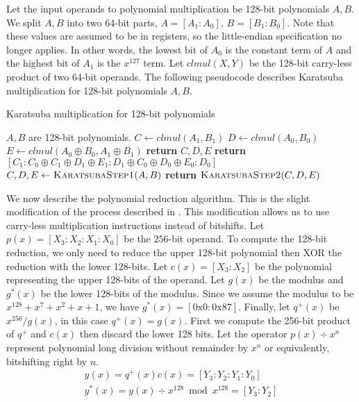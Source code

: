 \documentclass[hctr.tex]{subfiles}
\begin{document}
Let the input operands to polynomial multiplication be 128-bit polynomials $A, B$. We split $A, B$ into two 64-bit parts, $A = [A_1 : A_0]$, $B = [B_1 : B_0]$. Note that these values are assumed to be in registers, so the little-endian specification no longer applies. In other words, the lowest bit of $A_0$ is the constant term of $A$ and the highest bit of $A_1$ is the $x^{127}$ term. Let $clmul(X, Y)$ be the 128-bit carry-less product of two 64-bit operands. The following pseudocode describes Karatsuba multiplication for 128-bit polynomials $A, B$.
\begin{algorithm}[H]
\caption{Karatsuba multiplication for 128-bit polynomials}\label{karatsuba}
\begin{algorithmic}[1]
	\Require $A, B$ are 128-bit polynomials.
		\State $C \gets clmul(A_1, B_1)$
		\State $D \gets clmul(A_0, B_0)$
		\State $E \gets clmul(A_0 \oplus B_0, A_1 \oplus B_1)$
		\State \textbf{return} $C, D, E$
	\EndProcedure
	\State
		\State \textbf{return} $[C_1 : C_0 \oplus C_1 \oplus D_1 \oplus E_1 : D_1 \oplus C_0 \oplus D_0 \oplus E_0 : D_0]$
	\EndProcedure
	\State
		\State $C, D, E \gets \Call{KaratsubaStep1}{A, B}$
		\State \textbf{return} $\Call{KaratsubaStep2}{C, D, E}$
	\EndProcedure
\end{algorithmic}
\end{algorithm}
We now describe the polynomial reduction algorithm. This is the slight modification of the process described in \cite{CLMUL}. This modification allows us to use carry-less multiplication instructions instead of bitshifts. Let $p(x) = [X_3 : X_2 : X_1 : X_0]$ be the $256$-bit operand. To compute the 128-bit reduction, we only need to reduce the upper 128-bit polynomial then XOR the reduction with the lower 128-bits. Let $c(x) = [X_3 : X_2]$ be the polynomial representing the upper 128-bits of the operand. Let $g(x)$ be the modulus and $g^*(x)$ be the lower 128-bits of the modulus. Since we assume the modulus to be $x^{128} + x^7 + x^2 + x + 1$, we have $g^*(x) = [\text{0x0} : \text{0x87}]$. Finally, let $q^+(x)$ be $x^{256}/g(x)$, in this case $q^+(x) = g(x)$. First we compute the 256-bit product of $q^+$ and $c(x)$ then discard the lower 128 bits. Let the operator $p(x) \div x^{n}$ represent polynomial long division without remainder by $x^n$ or equivalently, bitshifting right by $n$.
\begin{gather*}
       y(x) = q^+(x)c(x) = [Y_3 : Y_2 : Y_1 : Y_0]\\
       y^*(x) = y(x) \div x^{128} \bmod x^{128} = [Y_3 : Y_2]
\end{gather*}
\end{document}
